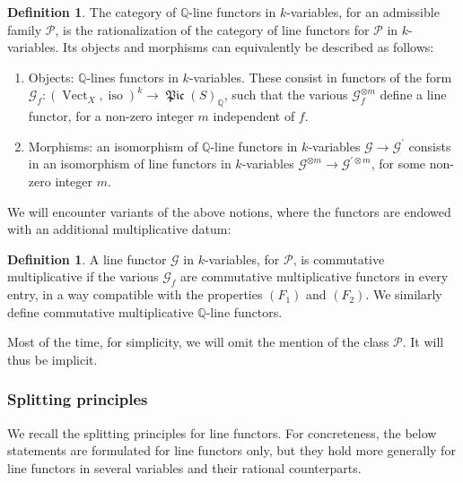 \documentclass[11pt]{article}
\theoremstyle{plain}
\theoremstyle{definition}
\newtheorem{definition}[theorem]{Definition}
\newcommand{\QBbb}{\mathbb Q}
\newcommand{\Gcal}{\mathcal G}
\newcommand{\Pcal}{\mathcal P}
\DeclareMathOperator{\Picfr}{\mathfrak{Pic}}
\DeclareMathOperator{\iso}{iso}
\DeclareMathOperator{\Vect}{Vect}
\begin{document}
\begin{definition}
The category of $\QBbb$-line functors in $k$-variables, for an admissible family $\Pcal$, is the rationalization of the category of line functors for $\Pcal$ in $k$-variables. Its objects and morphisms can equivalently be described as follows:
\begin{enumerate}
\item Objects: $\QBbb$-lines functors in $k$-variables. These consist in functors of the form $\Gcal_{f} \colon (\Vect_{X}, \iso)^{k} \to \Picfr(S)_{\QBbb}$, such that the various $\Gcal_{f}^{\otimes m}$ define a line functor, for a non-zero integer $m$ independent of $f$.
\item Morphisms: an isomorphism of $\QBbb$-line functors in $k$-variables $\Gcal\to\Gcal^{\prime}$ consists in an isomorphism of line functors in $k$-variables $\Gcal^{\otimes m}\to\Gcal^{\prime\otimes m}$, for some non-zero integer $m$.
\end{enumerate}
\end{definition}

We will encounter variants of the above notions, where the functors are endowed with an additional multiplicative datum:

\begin{definition}
A line functor $\Gcal$ in $k$-variables, for $\Pcal$, is commutative multiplicative if the various $\Gcal_{f}$ are commutative multiplicative functors in every entry, in a way compatible with the properties $(F_{1})$ and $(F_{2})$. We similarly define commutative multiplicative $\QBbb$-line functors.
\end{definition}
Most of the time, for simplicity, we will omit the mention of the class $\Pcal$. It will thus be implicit.

\subsubsection{Splitting principles}\label{subsubsec:splitting-principle}
We recall the splitting principles for line functors. For concreteness, the below statements are formulated for line functors only, but they hold more generally for line functors in several variables and their rational counterparts.
\end{document}
